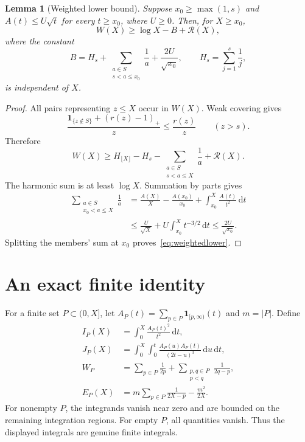 \documentclass[11pt]{article}
\newtheorem{lemma}[theorem]{Lemma}
\theoremstyle{definition}\newtheorem{definition}[theorem]{Definition}
\theoremstyle{remark}\newtheorem{remark}[theorem]{Remark}
\numberwithin{equation}{section}
\newcommand{\RR}{\mathcal R}
\newcommand{\dd}{\,\mathrm d}
\begin{document}
\begin{lemma}[Weighted lower bound]\label{lem:weightedlower}
Suppose $x_0\ge\max(1,s)$ and $A(t)\le U\sqrt t$ for every $t\ge x_0$, where $U\ge0$. Then, for $X\ge x_0$,
\begin{equation}\label{eq:weightedlower}
W(X)\ge\log X-B+\RR(X),
\end{equation}
where the constant
\[
B=H_s+\sum_{\substack{a\in S\\s<a\le x_0}}\frac1a+\frac{2U}{\sqrt{x_0}},
\qquad H_s=\sum_{j=1}^s\frac1j,
\]
is independent of $X$.
\end{lemma}
\begin{proof}
All pairs representing $z\le X$ occur in $W(X)$. Weak covering gives
\[
\frac{\mathbf1_{\{z\notin S\}}+(r(z)-1)_+}{z}\le\frac{r(z)}z
\qquad(z>s).
\]
Therefore
\[
W(X)\ge H_{\lfloor X\rfloor}-H_s-
\sum_{\substack{a\in S\\s<a\le X}}\frac1a+\RR(X).
\]
The harmonic sum is at least $\log X$. Summation by parts gives
\begin{align*}
\sum_{\substack{a\in S\\x_0<a\le X}}\frac1a
&=\frac{A(X)}X-\frac{A(x_0)}{x_0}
  +\int_{x_0}^X\frac{A(t)}{t^2}\dd t\\
&\le\frac{U}{\sqrt X}+U\int_{x_0}^X t^{-3/2}\dd t
\le\frac{2U}{\sqrt{x_0}}.
\end{align*}
Splitting the members' sum at $x_0$ proves~\eqref{eq:weightedlower}.
\end{proof}

\section{An exact finite identity}
For a finite set $P\subset(0,X]$, let $A_P(t)=\sum_{p\in P}\mathbf1_{[p,\infty)}(t)$ and $m=|P|$. Define
\begin{align*}
I_P(X)&=\int_0^X\frac{A_P(t)^2}{t^2}\dd t,\\
J_P(X)&=\int_0^X\int_0^t\frac{A_P(u)A_P(t)}{(2t-u)^3}\dd u\dd t,\\
W_P&=\sum_{p\in P}\frac1{2p}
       +\sum_{\substack{p,q\in P\\p<q}}\frac1{2q-p},\\
E_P(X)&=m\sum_{p\in P}\frac1{2X-p}-\frac{m^2}{2X}.
\end{align*}
For nonempty $P$, the integrands vanish near zero and are bounded on the remaining integration regions. For empty $P$, all quantities vanish. Thus the displayed integrals are genuine finite integrals.
\end{document}
